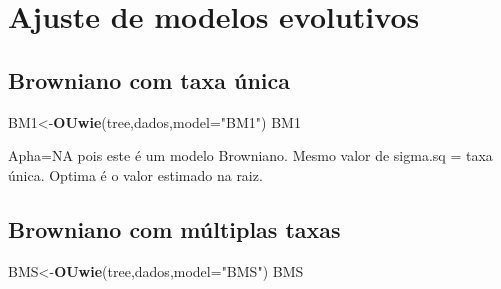 \documentclass[
]{book}
\newenvironment{Shaded}{\begin{snugshade}}{\end{snugshade}}
\newcommand{\AttributeTok}[1]{\textcolor[rgb]{0.13,0.29,0.53}{#1}}
\newcommand{\CommentTok}[1]{\textcolor[rgb]{0.56,0.35,0.01}{\textit{#1}}}
\newcommand{\DecValTok}[1]{\textcolor[rgb]{0.00,0.00,0.81}{#1}}
\newcommand{\FunctionTok}[1]{\textcolor[rgb]{0.13,0.29,0.53}{\textbf{#1}}}
\newcommand{\NormalTok}[1]{#1}
\newcommand{\OtherTok}[1]{\textcolor[rgb]{0.56,0.35,0.01}{#1}}
\newcommand{\SpecialCharTok}[1]{\textcolor[rgb]{0.81,0.36,0.00}{\textbf{#1}}}
\newcommand{\StringTok}[1]{\textcolor[rgb]{0.31,0.60,0.02}{#1}}
\begin{document}
\begin{Shaded}
\end{Shaded}

\section{Ajuste de modelos evolutivos}\label{ajuste-de-modelos-evolutivos}

\subsection{Browniano com taxa única}\label{browniano-com-taxa-uxfanica}

\begin{Shaded}
\begin{Highlighting}[]
\NormalTok{BM1}\OtherTok{\textless{}{-}}\FunctionTok{OUwie}\NormalTok{(tree,dados,}\AttributeTok{model=}\StringTok{"BM1"}\NormalTok{)}
\NormalTok{BM1}
\end{Highlighting}
\end{Shaded}

Apha=NA pois este é um modelo Browniano. Mesmo valor de sigma.sq = taxa única. Optima é o valor estimado na raiz.

\subsection{Browniano com múltiplas taxas}\label{browniano-com-muxfaltiplas-taxas}

\begin{Shaded}
\begin{Highlighting}[]
\NormalTok{BMS}\OtherTok{\textless{}{-}}\FunctionTok{OUwie}\NormalTok{(tree,dados,}\AttributeTok{model=}\StringTok{"BMS"}\NormalTok{)}
\NormalTok{BMS}
\end{Highlighting}
\end{Shaded}
\end{document}
